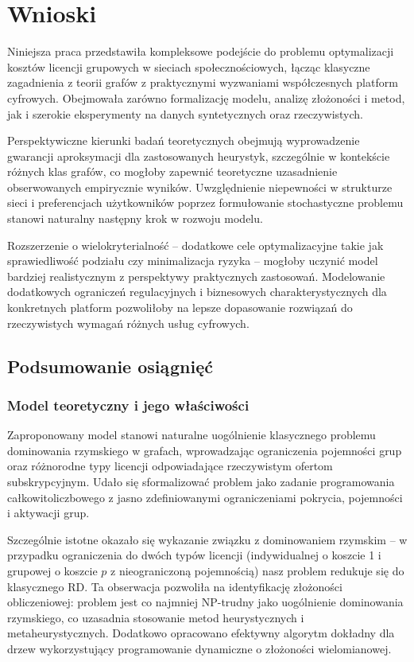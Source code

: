 \chapter{Wnioski}\label{chap:conclusion}

Niniejsza praca przedstawiła kompleksowe podejście do problemu optymalizacji kosztów licencji grupowych w sieciach społecznościowych, łącząc klasyczne zagadnienia z teorii grafów z praktycznymi wyzwaniami współczesnych platform cyfrowych. Obejmowała zarówno formalizację modelu, analizę złożoności i metod, jak i szerokie eksperymenty na danych syntetycznych oraz rzeczywistych.

Perspektywiczne kierunki badań teoretycznych obejmują wyprowadzenie gwarancji aproksymacji dla zastosowanych heurystyk, szczególnie w kontekście różnych klas grafów, co mogłoby zapewnić teoretyczne uzasadnienie obserwowanych empirycznie wyników. Uwzględnienie niepewności w strukturze sieci i preferencjach użytkowników poprzez formułowanie stochastyczne problemu stanowi naturalny następny krok w rozwoju modelu.

Rozszerzenie o wielokryterialność -- dodatkowe cele optymalizacyjne takie jak sprawiedliwość podziału czy minimalizacja ryzyka -- mogłoby uczynić model bardziej realistycznym z perspektywy praktycznych zastosowań. Modelowanie dodatkowych ograniczeń regulacyjnych i biznesowych charakterystycznych dla konkretnych platform pozwoliłoby na lepsze dopasowanie rozwiązań do rzeczywistych wymagań różnych usług cyfrowych.

\section{Podsumowanie osiągnięć}

\subsection{Model teoretyczny i jego właściwości}

Zaproponowany model stanowi naturalne uogólnienie klasycznego problemu dominowania rzymskiego w grafach, wprowadzając ograniczenia pojemności grup oraz różnorodne typy licencji odpowiadające rzeczywistym ofertom subskrypcyjnym. Udało się sformalizować problem jako zadanie programowania całkowitoliczbowego z jasno zdefiniowanymi ograniczeniami pokrycia, pojemności i aktywacji grup.

Szczególnie istotne okazało się wykazanie związku z dominowaniem rzymskim -- w przypadku ograniczenia do dwóch typów licencji (indywidualnej o koszcie 1 i grupowej o koszcie $p$ z nieograniczoną pojemnością) nasz problem redukuje się do klasycznego RD. Ta obserwacja pozwoliła na identyfikację złożoności obliczeniowej: problem jest co najmniej NP-trudny jako uogólnienie dominowania rzymskiego, co uzasadnia stosowanie metod heurystycznych i metaheurystycznych. Dodatkowo opracowano efektywny algorytm dokładny dla drzew wykorzystujący programowanie dynamiczne o złożoności wielomianowej.


